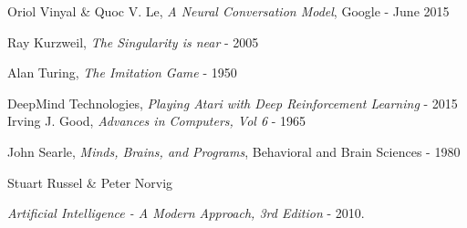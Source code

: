 \documentclass[12pt]{article}
\begin{document}
\begin{thebibliography}{40}

   Oriol Vinyal \& Quoc V. Le,
  {\em A Neural Conversation Model}, Google - June 2015

   Ray Kurzweil, {\em The Singularity is near} - 2005

   Alan Turing, {\em The Imitation Game} - 1950

   DeepMind Technologies, {\em Playing Atari with Deep
  Reinforcement Learning} - 2015
   Irving J. Good, {\em Advances in Computers, Vol 6} - 1965

   John Searle, {\em Minds, Brains, and Programs},
  Behavioral and Brain Sciences - 1980

   Stuart Russel \& Peter Norvig

  {\em Artificial Intelligence - A Modern Approach, 3rd Edition} - 2010.



\end{thebibliography}
\end{document}
